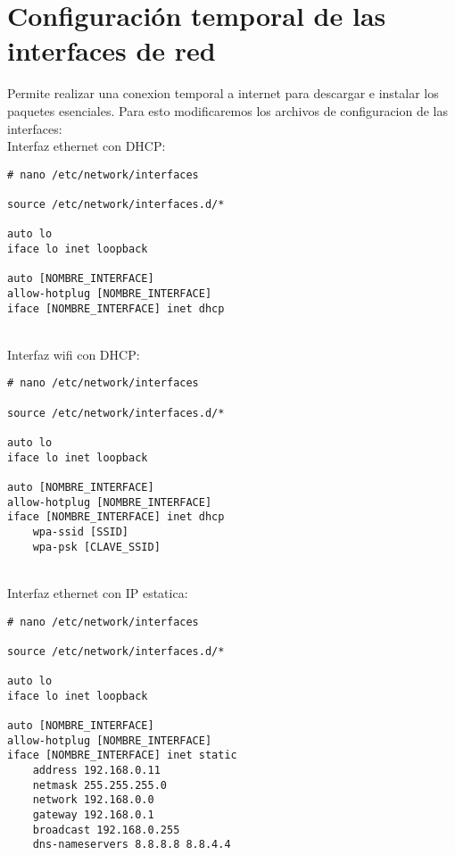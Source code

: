 \section{Configuración temporal de las interfaces de red}
Permite realizar una conexion temporal a internet para descargar e instalar los paquetes esenciales. Para esto modificaremos los archivos de configuracion de las interfaces:\\
Interfaz ethernet con DHCP:
\begin{verbatim}
# nano /etc/network/interfaces

source /etc/network/interfaces.d/*

auto lo
iface lo inet loopback

auto [NOMBRE_INTERFACE]
allow-hotplug [NOMBRE_INTERFACE]
iface [NOMBRE_INTERFACE] inet dhcp
\end{verbatim}
\\[1em]
Interfaz wifi con DHCP:
\begin{verbatim}
# nano /etc/network/interfaces
 
source /etc/network/interfaces.d/*

auto lo
iface lo inet loopback

auto [NOMBRE_INTERFACE]
allow-hotplug [NOMBRE_INTERFACE]
iface [NOMBRE_INTERFACE] inet dhcp
	wpa-ssid [SSID]
	wpa-psk [CLAVE_SSID]
\end{verbatim}
\\[1em]
Interfaz ethernet con IP estatica:
\begin{verbatim}
# nano /etc/network/interfaces
 
source /etc/network/interfaces.d/*

auto lo
iface lo inet loopback

auto [NOMBRE_INTERFACE]
allow-hotplug [NOMBRE_INTERFACE]
iface [NOMBRE_INTERFACE] inet static
	address 192.168.0.11
	netmask 255.255.255.0
	network 192.168.0.0
	gateway 192.168.0.1
	broadcast 192.168.0.255
	dns-nameservers 8.8.8.8 8.8.4.4
\end{verbatim}
\\[1em]

